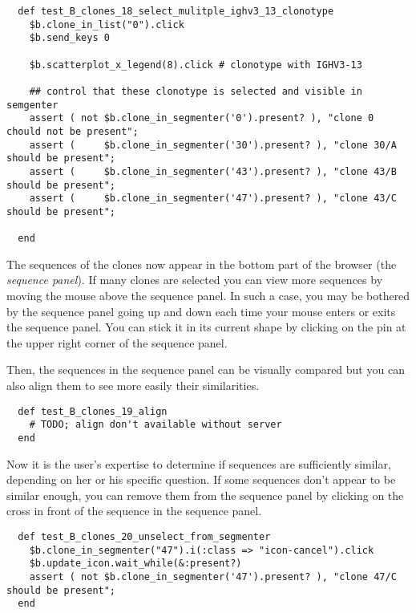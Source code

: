 \begin{verbatim}
  def test_B_clones_18_select_mulitple_ighv3_13_clonotype
    $b.clone_in_list("0").click
    $b.send_keys 0

    $b.scatterplot_x_legend(8).click # clonotype with IGHV3-13

    ## control that these clonotype is selected and visible in semgenter
    assert ( not $b.clone_in_segmenter('0').present? ), "clone 0 chould not be present";
    assert (     $b.clone_in_segmenter('30').present? ), "clone 30/A should be present";
    assert (     $b.clone_in_segmenter('43').present? ), "clone 43/B should be present";
    assert (     $b.clone_in_segmenter('47').present? ), "clone 43/C should be present";

  end
\end{verbatim}

The sequences of the clones now appear in the bottom part of the browser (the
\textit{sequence panel}). If many clones are selected you can view more sequences
by moving the mouse above the sequence panel.
 In such a case, you may be bothered by the sequence panel going up and
down each time your mouse enters or exits the sequence panel. You can stick it
in its current shape by clicking on the pin at the upper right corner of the
sequence panel.

Then, the sequences in the sequence panel can be visually compared but you can also align
them to see more easily their similarities.


\begin{verbatim}
  def test_B_clones_19_align
    # TODO; align don't available without server
  end
\end{verbatim}

Now it is the user's expertise to determine if sequences are sufficiently
similar, depending on her or his specific question. If some sequences don't appear to be similar enough, you can remove
them from the sequence panel by clicking on the cross in front of the sequence in
the sequence panel.
\begin{verbatim}
  def test_B_clones_20_unselect_from_segmenter
    $b.clone_in_segmenter("47").i(:class => "icon-cancel").click
    $b.update_icon.wait_while(&:present?)
    assert ( not $b.clone_in_segmenter('47').present? ), "clone 47/C should be present";
  end
\end{verbatim}

